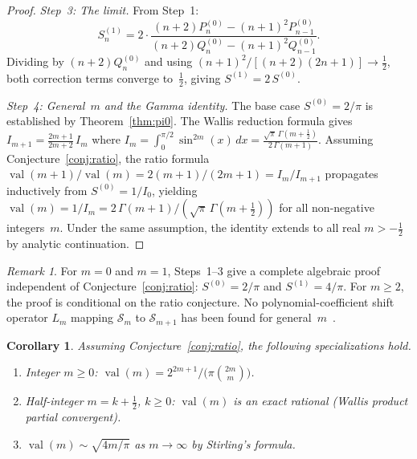 \documentclass[11pt,a4paper]{article}
\theoremstyle{plain}
\newtheorem{corollary}[theorem]{Corollary}
\theoremstyle{definition}
\theoremstyle{remark}
\newtheorem{remark}[theorem]{Remark}
\newcommand{\half}{\tfrac{1}{2}}
\begin{document}
\begin{proof}
\medskip
\emph{Step~3: The limit.}
From Step~1:
\[
  S_n^{(1)}
  = 2\cdot\frac{(n{+}2)P_n^{(0)} - (n{+}1)^2 P_{n-1}^{(0)}}
              {(n{+}2)Q_n^{(0)} - (n{+}1)^2 Q_{n-1}^{(0)}}.
\]
Dividing by $(n{+}2)Q_n^{(0)}$ and using
$(n{+}1)^2/[(n{+}2)(2n{+}1)] \to \frac{1}{2}$,
both correction terms converge to~$\frac{1}{2}$, giving
$S^{(1)} = 2\,S^{(0)}$.

\medskip
\emph{Step~4: General~$m$ and the Gamma identity.}
The base case $S^{(0)} = 2/\pi$ is established by
Theorem~\ref{thm:pi0}.
The Wallis reduction formula gives
$I_{m+1} = \frac{2m{+}1}{2m{+}2}\,I_m$
where $I_m = \int_0^{\pi/2}\sin^{2m}(x)\,dx
= \frac{\sqrt{\pi}\,\Gamma(m{+}\frac{1}{2})}{2\,\Gamma(m{+}1)}$.
Assuming Conjecture~\ref{conj:ratio},
the ratio formula
$\operatorname{val}(m{+}1)/\operatorname{val}(m)
= 2(m{+}1)/(2m{+}1) = I_m/I_{m+1}$
propagates inductively from $S^{(0)} = 1/I_0$,
yielding $\operatorname{val}(m) = 1/I_m =
2\,\Gamma(m{+}1)/(\sqrt{\pi}\,\Gamma(m{+}\half))$
for all non-negative integers~$m$.
Under the same assumption, the identity extends to all real
$m > -\frac{1}{2}$ by analytic continuation.
\end{proof}

\begin{remark}
For $m = 0$ and $m = 1$, Steps~1--3 give a complete algebraic proof
independent of Conjecture~\ref{conj:ratio}:
$S^{(0)} = 2/\pi$ and $S^{(1)} = 4/\pi$.
For $m \ge 2$, the proof is conditional on the ratio conjecture.
No polynomial-coefficient shift operator $L_m$ mapping $\mathcal{S}_m$
to $\mathcal{S}_{m+1}$ has been found for general~$m$~\cite{raayoni2021}.
\end{remark}

\begin{corollary}\label{cor:special}
Assuming Conjecture~\ref{conj:ratio}, the following specializations hold.
\begin{enumerate}
\item[\textup{(i)}]
  Integer $m \ge 0$:
  $\operatorname{val}(m) = 2^{2m+1}/\bigl(\pi\binom{2m}{m}\bigr)$.
\item[\textup{(ii)}]
  Half-integer $m = k{+}\half$, $k \ge 0$:
  $\operatorname{val}(m)$ is an exact rational (Wallis product partial convergent).
\item[\textup{(iii)}]
  $\operatorname{val}(m) \sim \sqrt{4m/\pi}$
  as $m \to \infty$ by Stirling's formula.
\end{enumerate}
\end{corollary}

\end{document}
